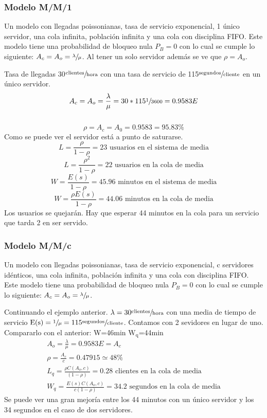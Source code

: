 \subsubsection{Modelo M/M/1}
Un modelo con llegadas poissonianas, tasa de servicio exponencial, 1 único servidor, una cola infinita, población infinita y una cola con disciplina \acrshort{FIFO}. Este modelo tiene una probabilidad de bloqueo nula $P_B=0$ con lo cual se cumple lo siguiente: $A_c=A_o=\sfrac{\lambda}{\mu}$. Al tener un solo servidor además se ve que $\rho=A_o$.
\begin{example}[M/M/1]
Tasa de llegadas 30$\sfrac{\text{clientes}}{\text{hora}}$ con una tasa de servicio de 115$\sfrac{\text{segundos}}{\text{cliente}}$ en un único servidor.
\[A_c=A_o=\frac{\lambda}{\mu}=30*115\sfrac{1}{3600}=0.9583E\] \\
\[\rho=A_c=A_0=0.9583=95.83\%\] Como se puede ver el servidor está a punto de saturarse.\\
\[L=\frac{\rho}{1-\rho}=23\text{ usuarios en el sistema de media}\]
\[L=\frac{\rho^2}{1-\rho}=22\text{ usuarios en la cola de media}\]
\[W=\frac{E(s)}{1-\rho}=45.96\text{ minutos en el sistema de media}\]
\[W=\frac{\rho E(s)}{1-\rho}=44.06\text{ minutos en la cola de media}\]
Los usuarios se quejarán. Hay que esperar 44 minutos en la cola para un servicio que tarda 2 en ser servido.
\end{example}
\subsubsection{Modelo M/M/c}
Un modelo con llegadas poissonianas, tasa de servicio exponencial, c servidores idénticos, una cola infinita, población infinita y una cola con disciplina \acrshort{FIFO}. Este modelo tiene una probabilidad de bloqueo nula $P_B=0$ con lo cual se cumple lo siguiente: $A_c=A_o=\sfrac{\lambda}{\mu}$.\\
\begin{example}[M/M/c]
Continuando el ejemplo anterior. $\lambda=30\sfrac{\text{clientes}}{\text{hora}}$ con una media de tiempo de servicio $\text{E(s)}=\sfrac{1}{\mu}=115\sfrac{\text{segundos}}{\text{cliente}}$. Contamos con 2 sevidores en lugar de uno. Compararlo con el anterior: W=46min $\text{W}_{\text{q}}$=44min\\
\begin{gather*}
A_o=\frac{\lambda}{\mu}=0.9583E=A_c\\
\rho=\frac{A_c}{c}=0.47915\simeq 48\% \\
L_q=\frac{\rho C(A_o,c)}{(1-\rho)}=0.28\text{ clientes en la cola de media}\\
W_q=\frac{E(s)C(A_o,c)}{c(1-\rho)}=34.2\text{ segundos en la cola de media}
\end{gather*}
Se puede ver una gran mejoría entre los 44 minutos con un único servidor y los 34 segundos en el caso de dos servidores.
\end{example}
